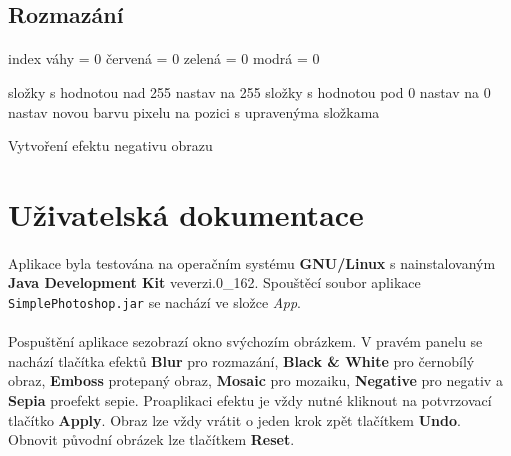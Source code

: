 \documentclass[12pt]{scrartcl}
\begin{document}
\subsection{Rozmazání}
\paragraph{}
\begin{algorithm}[H]
	 {
		 {

			index váhy = 0\;
			červená = 0\;
			zelená = 0\;
			modrá = 0\;
			
			 {
				 {
				}
			}
			složky s hodnotou nad 255 nastav na 255\;
			složky s hodnotou pod 0 nastav na 0\;	
			nastav novou barvu pixelu na pozici s upravenýma složkama\;
		}
	}
 \caption{Vytvoření efektu negativu obrazu}
\end{algorithm}

\newpage
\section{Uživatelská dokumentace}
\paragraph{}
Aplikace byla testována na operačním systému \textbf{GNU/Linux} s nainstalovaným \textbf{Java Development Kit} ve\nobreakspace verzi.0\_162. Spouštěcí soubor aplikace \texttt{SimplePhotoshop.jar} se nachází ve složce \emph{App}.

\paragraph{}
Po\nobreakspace spuštění aplikace se\nobreakspace zobrazí okno s\nobreakspace výchozím obrázkem. V pravém panelu se nachází tlačítka efektů \textbf{Blur} pro rozmazání, \textbf{Black \& White} pro černobílý obraz, \textbf{Emboss} pro\nobreakspace tepaný obraz, \textbf{Mosaic} pro mozaiku, \textbf{Negative} pro negativ a \textbf{Sepia} pro\nobreakspace efekt sepie. Pro\nobreakspace aplikaci efektu je vždy nutné kliknout na potvrzovací tlačítko \textbf{Apply}. Obraz lze vždy vrátit o jeden krok zpět tlačítkem \textbf{Undo}. Obnovit původní obrázek lze tlačítkem \textbf{Reset}.
\end{document}
